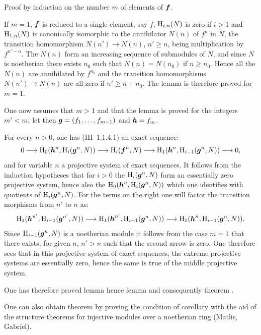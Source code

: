 Proof by induction on the number $m$ of elements of $\boldsymbol{f}$.

If $m=1$, $\boldsymbol{f}$ is reduced to a single element, say $f$, $\operatorname{H}_{i, n}(N)$ is zero if $i>1$ and $\operatorname{H}_{1, n}(N)$ is canonically isomorphic to the annihilator $N(n)$ of $f^n$ in $N$, the transition homomorphism $N(n')\to N(n)$, $n'\geq n$, being multiplication by $f^{n'-n}$. The $N(n)$ form an increasing sequence of submodules of $N$, and since $N$ is noetherian there exists $n_0$ such that $N(n)=N(n_0)$ if $n\geq n_0$. Hence all the $N(n)$ are annihilated by $f^{n_0}$ and the transition homomorphisms $N(n')\to N(n)$ are all zero if $n'\geq n+n_0$. The lemma is therefore proved for $m=1$.

One now assumes that $m>1$ and that the lemma is proved for the integers $m'<m$; let then $\boldsymbol{g}=(f_1, \ldots, f_{m-1})$ and $\boldsymbol{h}=f_m$.

For every $n>0$, one has (\EGA III~1.1.4.1) an exact sequence:
\begin{equation*}
0 \to \H_0(\bbh^n, \H_i(\bbg^n, N)) \to \H_i(\bbf^n, N) \to \H_1(\bbh^n, \H_{i-1}(\bbg^n, N)) \to 0,
\end{equation*}
and for variable $n$ a projective system of exact sequences. It follows from the induction hypotheses that for $i>0$ the $\operatorname{H}_i(\boldsymbol{g}^n, N)$ form an essentially zero projective system, hence also the $\operatorname{H}_0(\boldsymbol{h}^n, \operatorname{H}_i(\boldsymbol{g}^n, N))$ which one identifies with quotients of $\operatorname{H}_i(\boldsymbol{g}^n, N)$. For the terms on the right one will factor the transition morphisms from $n'$ to $n$ as:
\begin{equation*}
\H_1(\bbh^{n'}, \H_{i-1}(\bbg^{n'}, N)) \to \H_1(\bbh^{n'}, \H_{i-1}(\bbg^{n}, N)) \to \H_1(\bbh^{n}, \H_{i-1}(\bbg^{n}, N)).
\end{equation*}
Since $\operatorname{H}_{i-1}(\boldsymbol{g}^{n}, N)$ is a noetherian module it follows from the case $m=1$ that there exists, for given $n$, $n'>n$ such that the second arrow is zero. One therefore sees that in this projective system of exact sequences, the extreme projective systems are essentially zero, hence the same is true of the middle projective system.

One has therefore proved lemma  hence lemma  and consequently theorem .

\begin{remarkstar}
One can also obtain theorem  by proving the condition of corollary  with the aid of the structure theorems for injective modules over a noetherian ring (Matlis, Gabriel).
\end{remarkstar}
